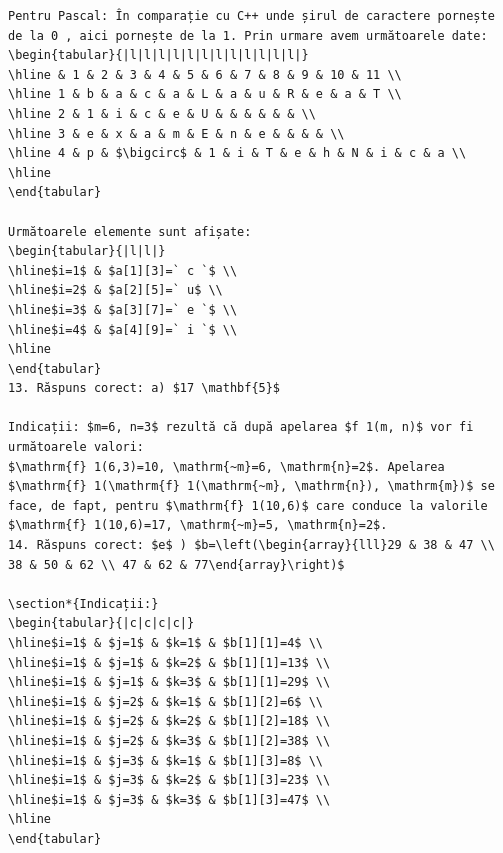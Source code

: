 \documentclass[10pt]{article}
\begin{document}
\begin{verbatim}
Pentru Pascal: În comparație cu C++ unde șirul de caractere pornește de la 0 , aici pornește de la 1. Prin urmare avem următoarele date:
\begin{tabular}{|l|l|l|l|l|l|l|l|l|l|l|l|}
\hline & 1 & 2 & 3 & 4 & 5 & 6 & 7 & 8 & 9 & 10 & 11 \\
\hline 1 & b & a & c & a & L & a & u & R & e & a & T \\
\hline 2 & 1 & i & c & e & U & & & & & & \\
\hline 3 & e & x & a & m & E & n & e & & & & \\
\hline 4 & p & $\bigcirc$ & 1 & i & T & e & h & N & i & c & a \\
\hline
\end{tabular}

Următoarele elemente sunt afișate:
\begin{tabular}{|l|l|}
\hline$i=1$ & $a[1][3]=` c `$ \\
\hline$i=2$ & $a[2][5]=` u$ \\
\hline$i=3$ & $a[3][7]=` e `$ \\
\hline$i=4$ & $a[4][9]=` i `$ \\
\hline
\end{tabular}
13. Răspuns corect: a) $17 \mathbf{5}$

Indicații: $m=6, n=3$ rezultă că după apelarea $f 1(m, n)$ vor fi următoarele valori:
$\mathrm{f} 1(6,3)=10, \mathrm{~m}=6, \mathrm{n}=2$. Apelarea $\mathrm{f} 1(\mathrm{f} 1(\mathrm{~m}, \mathrm{n}), \mathrm{m})$ se face, de fapt, pentru $\mathrm{f} 1(10,6)$ care conduce la valorile $\mathrm{f} 1(10,6)=17, \mathrm{~m}=5, \mathrm{n}=2$.
14. Răspuns corect: $e$ ) $b=\left(\begin{array}{lll}29 & 38 & 47 \\ 38 & 50 & 62 \\ 47 & 62 & 77\end{array}\right)$

\section*{Indicații:}
\begin{tabular}{|c|c|c|c|}
\hline$i=1$ & $j=1$ & $k=1$ & $b[1][1]=4$ \\
\hline$i=1$ & $j=1$ & $k=2$ & $b[1][1]=13$ \\
\hline$i=1$ & $j=1$ & $k=3$ & $b[1][1]=29$ \\
\hline$i=1$ & $j=2$ & $k=1$ & $b[1][2]=6$ \\
\hline$i=1$ & $j=2$ & $k=2$ & $b[1][2]=18$ \\
\hline$i=1$ & $j=2$ & $k=3$ & $b[1][2]=38$ \\
\hline$i=1$ & $j=3$ & $k=1$ & $b[1][3]=8$ \\
\hline$i=1$ & $j=3$ & $k=2$ & $b[1][3]=23$ \\
\hline$i=1$ & $j=3$ & $k=3$ & $b[1][3]=47$ \\
\hline
\end{tabular}


\end{verbatim}
\end{document}
